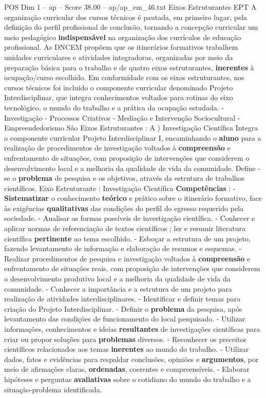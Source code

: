 \begin{textsample}{POS Dim 1 – ap – Score 38.00 – ap/ap\_em\_46.txt}  \label{ex:f1_pos_170}
Eixos Estruturantes EPT A organização curricular dos cursos técnicos é pautada, em primeiro lugar, pela definição do perfil profissional de conclusão, tornando a concepção curricular um meio pedagógico \textbf{indispensável} na organização dos currículos de educação profissional.
As DNCEM propõem que os itinerários formativos trabalhem unidades curriculares e atividades integradoras, organizadas por meio da preparação básica para o trabalho e de quatro eixos estruturantes, \textbf{inerentes} à ocupação/curso escolhido.
Em conformidade com os eixos estruturantes, nos cursos técnicos foi incluído o componente curricular denominado Projeto Interdisciplinar, que integra conhecimentos voltados para rotinas do eixo tecnológico, o mundo do trabalho e a prática da ocupação estudada. - Investigação - Processos Criativos - Mediação e Intervenção Sociocultural - Empreendedorismo São Eixos Estruturantes : A ) Investigação Científica Integra o componente curricular Projeto Interdisciplinar I, encaminhando o \textbf{aluno} para a realização de procedimentos de investigação voltados à \textbf{compreensão} e enfrentamento de situações, com proposição de intervenções que considerem o desenvolvimento local e a melhoria da qualidade de vida da comunidade.
Define -se o \textbf{problema} de pesquisa e os objetivos, através da estrutura de trabalhos científicos.
Eixo Estruturante : Investigação Científica \textbf{Competências} : - \textbf{Sistematizar} o conhecimento \textbf{teórico} e prático sobre o itinerário formativo, face às exigências \textbf{qualitativas} das condições do perfil do egresso requerido pela sociedade. - Analisar as formas possíveis de investigação científica. - Conhecer e aplicar normas de referenciação de textos científicos ; ler e resumir literatura científica \textbf{pertinente} ao tema escolhido. - Esboçar a estrutura de um projeto, fazendo levantamento de informação e elaboração de resumos e esquemas. - Realizar procedimentos de pesquisa e investigação voltados à \textbf{compreensão} e enfrentamento de situações reais, com proposição de intervenções que considerem o desenvolvimento produtivo local e a melhoria da qualidade de vida da comunidade. - Conhecer a importância e a estrutura de um projeto para realização de atividades interdisciplinares. - Identificar e definir temas para criação do Projeto Interdisciplinar. - Definir o \textbf{problema} da pesquisa, após levantamento das condições de funcionamento do local pesquisado. - Utilizar informações, conhecimentos e ideias \textbf{resultantes} de investigações científicas para criar ou propor soluções para \textbf{problemas} diversos. - Reconhecer os preceitos científicos relacionados aos temas \textbf{inerentes} ao mundo do trabalho. - Utilizar dados, fatos e evidências para respaldar conclusões, opiniões e \textbf{argumentos}, por meio de afirmações claras, \textbf{ordenadas}, coerentes e compreensíveis. - Elaborar hipóteses e perguntas \textbf{avaliativas} sobre o cotidiano do mundo do trabalho e a situação-problema identificada.

\end{textsample}
